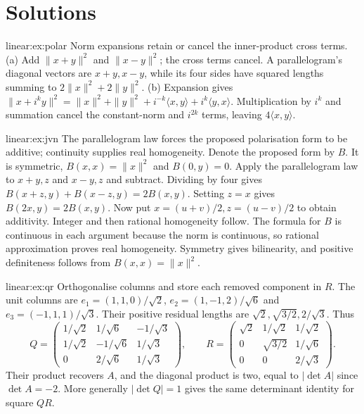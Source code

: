 \section{Solutions}
\begin{solution}{linear:ex:polar}
\idea Norm expansions retain or cancel the inner-product cross terms.
\writeup (a) Add $\|x+y\|^2$ and $\|x-y\|^2$; the cross terms cancel. A parallelogram's diagonal vectors are $x+y,x-y$, while its four sides have squared lengths summing to $2\|x\|^2+2\|y\|^2$. (b) Expansion gives $\|x+i^ky\|^2=\|x\|^2+\|y\|^2+i^{-k}\langle x,y\rangle+i^k\langle y,x\rangle$. Multiplication by $i^k$ and summation cancel the constant-norm and $i^{2k}$ terms, leaving $4\langle x,y\rangle$.
\end{solution}
\begin{solution}{linear:ex:jvn}
\idea The parallelogram law forces the proposed polarisation form to be additive; continuity supplies real homogeneity.
\writeup Denote the proposed form by $B$. It is symmetric, $B(x,x)=\|x\|^2$ and $B(0,y)=0$. Apply the parallelogram law to $x+y,z$ and $x-y,z$ and subtract. Dividing by four gives $B(x+z,y)+B(x-z,y)=2B(x,y)$. Setting $z=x$ gives $B(2x,y)=2B(x,y)$. Now put $x=(u+v)/2,z=(u-v)/2$ to obtain additivity. Integer and then rational homogeneity follow. The formula for $B$ is continuous in each argument because the norm is continuous, so rational approximation proves real homogeneity. Symmetry gives bilinearity, and positive definiteness follows from $B(x,x)=\|x\|^2$.
\end{solution}
\begin{solution}{linear:ex:qr}
\idea Orthogonalise columns and store each removed component in $R$.
\writeup The unit columns are $e_1=(1,1,0)/\sqrt2$, $e_2=(1,-1,2)/\sqrt6$ and $e_3=(-1,1,1)/\sqrt3$. Their positive residual lengths are $\sqrt2,\sqrt{3/2},2/\sqrt3$. Thus
\[Q=\begin{pmatrix}1/\sqrt2&1/\sqrt6&-1/\sqrt3\\1/\sqrt2&-1/\sqrt6&1/\sqrt3\\0&2/\sqrt6&1/\sqrt3\end{pmatrix},\qquad
R=\begin{pmatrix}\sqrt2&1/\sqrt2&1/\sqrt2\\0&\sqrt{3/2}&1/\sqrt6\\0&0&2/\sqrt3\end{pmatrix}.
\]
Their product recovers $A$, and the diagonal product is two, equal to $|\det A|$ since $\det A=-2$. More generally $|\det Q|=1$ gives the same determinant identity for square $QR$.
\end{solution}

